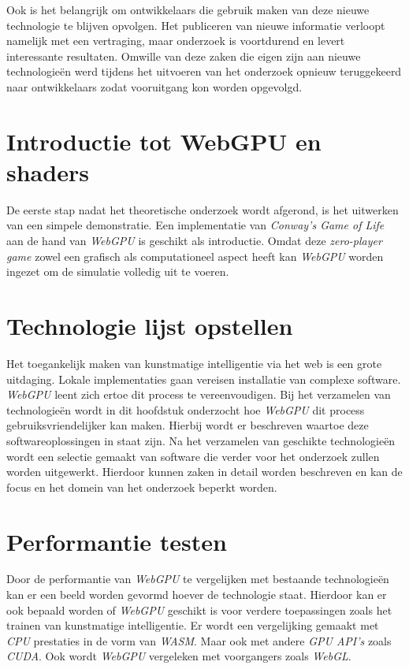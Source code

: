 \bigbreak{}

Ook is het belangrijk om ontwikkelaars die gebruik maken van deze nieuwe technologie te blijven opvolgen. Het publiceren van nieuwe informatie verloopt namelijk met een vertraging, maar onderzoek is voortdurend en levert interessante resultaten. Omwille van deze zaken die eigen zijn aan nieuwe technologieën werd tijdens het uitvoeren van het onderzoek opnieuw teruggekeerd naar ontwikkelaars zodat vooruitgang kon worden opgevolgd.

\section{Introductie tot WebGPU en shaders}

De eerste stap nadat het theoretische onderzoek wordt afgerond, is het uitwerken van een simpele demonstratie. Een implementatie van \textit{Conway's Game of Life} aan de hand van \textit{WebGPU} is geschikt als introductie. Omdat deze 
\textit{zero-player game} zowel een grafisch als computationeel aspect heeft kan \textit{WebGPU} worden ingezet om de simulatie volledig uit te voeren.

\section{Technologie lijst opstellen}

Het toegankelijk maken van kunstmatige intelligentie via het web is een grote uitdaging. Lokale implementaties gaan vereisen installatie van complexe software. \textit{WebGPU} leent zich ertoe dit process te vereenvoudigen. Bij het verzamelen van technologieën wordt in dit hoofdstuk onderzocht hoe \textit{WebGPU} dit process ge\-bruiks\-vrien\-de\-lij\-ker kan maken. Hierbij wordt er beschreven waartoe deze softwareoplossingen in staat zijn. Na het verzamelen van geschikte technologieën wordt een selectie gemaakt van software die verder voor het onderzoek zullen worden uitgewerkt. Hierdoor kunnen zaken in detail worden beschreven en kan de focus en het domein van het onderzoek beperkt worden.

\section{Performantie testen}

Door de performantie van \textit{WebGPU} te vergelijken met bestaande technologieën kan er een beeld worden gevormd hoever de technologie staat. Hierdoor kan er ook bepaald worden of \textit{WebGPU} geschikt is voor verdere toepassingen zoals het trainen van kunstmatige intelligentie. Er wordt een vergelijking gemaakt met \textit{CPU} prestaties in de vorm van \textit{WASM}. Maar ook met andere \textit{GPU API's} zoals \textit{CUDA}. Ook wordt \textit{WebGPU} vergeleken met voorgangers zoals \textit{WebGL}.

